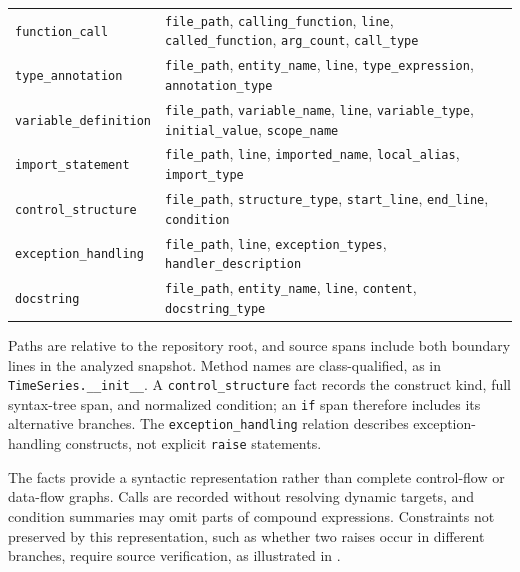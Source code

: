 \begin{table}[htbp]
\begin{tabularx}{\linewidth}{@{}l>{\raggedright\arraybackslash}X@{}}
\texttt{function\_call} & \mbox{\texttt{file\_path}}, \mbox{\texttt{calling\_function}}, \mbox{\texttt{line}}, \mbox{\texttt{called\_function}}, \mbox{\texttt{arg\_count}}, \mbox{\texttt{call\_type}} \\
\texttt{type\_annotation} & \mbox{\texttt{file\_path}}, \mbox{\texttt{entity\_name}}, \mbox{\texttt{line}}, \mbox{\texttt{type\_expression}}, \mbox{\texttt{annotation\_type}} \\
\texttt{variable\_definition} & \mbox{\texttt{file\_path}}, \mbox{\texttt{variable\_name}}, \mbox{\texttt{line}}, \mbox{\texttt{variable\_type}}, \mbox{\texttt{initial\_value}}, \mbox{\texttt{scope\_name}} \\
\texttt{import\_statement} & \mbox{\texttt{file\_path}}, \mbox{\texttt{line}}, \mbox{\texttt{imported\_name}}, \mbox{\texttt{local\_alias}}, \mbox{\texttt{import\_type}} \\
\texttt{control\_structure} & \mbox{\texttt{file\_path}}, \mbox{\texttt{structure\_type}}, \mbox{\texttt{start\_line}}, \mbox{\texttt{end\_line}}, \mbox{\texttt{condition}} \\
\texttt{exception\_handling} & \mbox{\texttt{file\_path}}, \mbox{\texttt{line}}, \mbox{\texttt{exception\_types}}, \mbox{\texttt{handler\_description}} \\
\texttt{docstring} & \mbox{\texttt{file\_path}}, \mbox{\texttt{entity\_name}}, \mbox{\texttt{line}}, \mbox{\texttt{content}}, \mbox{\texttt{docstring\_type}} \\
\bottomrule
\end{tabularx}
\endgroup
\end{table}

Paths are relative to the repository root, and source spans include both boundary lines in the analyzed snapshot. Method names are class-qualified, as in \texttt{TimeSeries.\_\_init\_\_}. A \texttt{control\_structure} fact records the construct kind, full syntax-tree span, and normalized condition; an \texttt{if} span therefore includes its alternative branches. The \texttt{exception\_handling} relation describes exception-handling constructs, not explicit \texttt{raise} statements.

The facts provide a syntactic representation rather than complete control-flow or data-flow graphs. Calls are recorded without resolving dynamic targets, and condition summaries may omit parts of compound expressions. Constraints not preserved by this representation, such as whether two raises occur in different branches, require source verification, as illustrated in .
